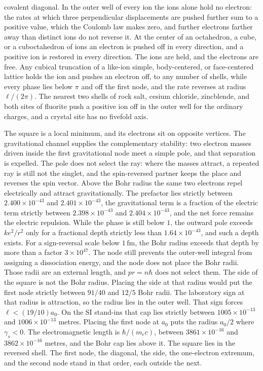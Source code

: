\documentclass[a4paper]{article}
\begin{document}
covalent diagonal. In the outer well of every ion the ions alone hold no electron: the rates at which three perpendicular displacements are pushed further sum to a positive value, which the Coulomb law makes zero, and further electrons farther away than distinct ions do not reverse it. At the center of an octahedron, a cube, or a cuboctahedron of ions an electron is pushed off in every direction, and a positive ion is restored in every direction. The ions are held, and the electrons are free. Any cubical truncation of a like-ion simple, body-centered, or face-centered lattice holds the ion and pushes an electron off, to any number of shells, while every phase lies below \(\pi\) and off the first node, and the rate reverses at radius \(\ell/(2\pi)\). The nearest two shells of rock salt, cesium chloride, zincblende, and both sites of fluorite push a positive ion off in the outer well for the ordinary charges, and a crystal site has no fivefold axis.

The square is a local minimum, and its electrons sit on opposite vertices. The gravitational channel supplies the complementary stability: two electron masses driven inside the first gravitational node meet a simple pole, and that separation is expelled. The pole does not select the ray: where the masses attract, a repeated ray is still not the singlet, and the spin-reversed partner keeps the place and reverses the spin vector. Above the Bohr radius the same two electrons repel electrically and attract gravitationally. The prefactor lies strictly between \(2.400\times 10^{-43}\) and \(2.401\times 10^{-43}\), the gravitational term is a fraction of the electric term strictly between \(2.398\times 10^{-43}\) and \(2.404\times 10^{-43}\), and the net force remains the electric repulsion. While the phase is still below \(1\), the outward pole exceeds \(k e^{2}/r^{2}\) only for a fractional depth strictly less than \(1.64\times 10^{-43}\), and such a depth exists. For a sign-reversal scale below \(1\,\mathrm{fm}\), the Bohr radius exceeds that depth by more than a factor \(3\times 10^{47}\). The node still prevents the outer-well integral from assigning a dissociation energy, and the node does not place the Bohr radii. Those radii are an external length, and \(pr=n\hbar\) does not select them. The side of the square is not the Bohr radius. Placing the side at that radius would put the first node strictly between \(91/40\) and \(12/5\) Bohr radii. The laboratory sign at that radius is attraction, so the radius lies in the outer well. That sign forces \(\ell<(19/10)a_0\). On the SI stand-ins that cap lies strictly between \(1005\times 10^{-13}\) and \(1006\times 10^{-13}\) metres. Placing the first node at \(a_0\) puts the radius \(a_0/2\) where \(\gamma_s<0\). The electromagnetic length is \(\hbar/(m_e c)\), between \(3861\times 10^{-16}\) and \(3862\times 10^{-16}\) metres, and the Bohr cap lies above it. The square lies in the reversed shell. The first node, the diagonal, the side, the one-electron extremum, and the second node stand in that order, each outside the next.
\end{document}
